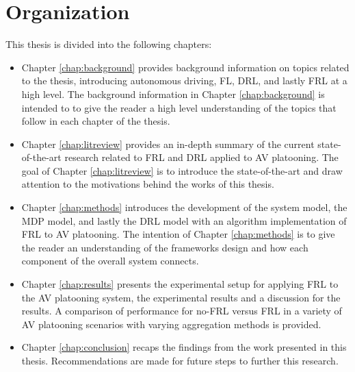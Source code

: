 \section{Organization}
This thesis is divided into the following chapters:

\begin{itemize}
    \item Chapter \ref{chap:background} provides background information on
    topics related to the thesis, introducing autonomous driving, FL, DRL,
    and lastly FRL at a high level. The background information in Chapter
    \ref{chap:background} is intended to to give the reader a high level
    understanding of the topics that follow in each
    chapter of the thesis.
    \vspace{12pt}
    \item Chapter \ref{chap:litreview} provides an in-depth summary of
    the current state-of-the-art research related to FRL and DRL applied
    to AV platooning. The goal of Chapter \ref{chap:litreview} is to
    introduce the state-of-the-art and draw attention to the motivations
    behind the works of this thesis.
    \vspace{12pt}
    \item Chapter \ref{chap:methods} introduces the development of the
    system model, the MDP model, and lastly the DRL model with an
    algorithm implementation of FRL to AV platooning.  The intention of
    Chapter \ref{chap:methods} is to give the reader an understanding of
    the frameworks design and how each component of the overall system
    connects.
    \vspace{12pt}
    \item Chapter \ref{chap:results} presents the experimental
    setup for applying FRL to the AV platooning system, the
    experimental results and a discussion for the results. A comparison of performance for
    no-FRL versus FRL in a variety of AV platooning scenarios with varying
    aggregation methods is provided.
    \vspace{12pt}
    \item Chapter \ref{chap:conclusion} recaps the findings
    from the work presented in this thesis. Recommendations
    are made for future steps to further this research.
\end{itemize}

